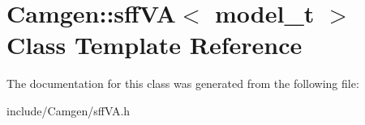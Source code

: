 \hypertarget{a00496}{\section{Camgen\-:\-:sff\-V\-A$<$ model\-\_\-t $>$ Class Template Reference}
\label{a00496}
}


The documentation for this class was generated from the following file\-:\begin{DoxyCompactItemize}
\item 
include/\-Camgen/sff\-V\-A.\-h\end{DoxyCompactItemize}

